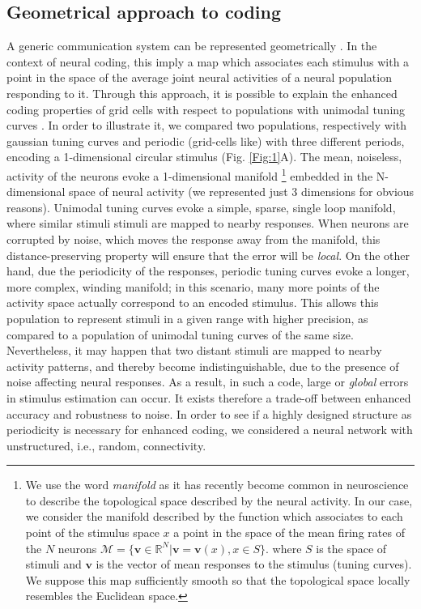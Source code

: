 \documentclass[a4paper]{article}
\begin{document}
\subsection{Geometrical approach to coding }
A generic communication system can be represented geometrically \cite[]{Shannon1949CommunicationNoise}. In the context of neural coding, this imply a map which associates each stimulus with a point in the space of the average joint neural activities of a neural population responding to it. Through this approach, it is possible to explain the enhanced coding properties of grid cells with respect to populations with unimodal tuning curves \cite[]{Sreenivasan2011GridComputation}. In order to illustrate it, we compared two populations, respectively with gaussian tuning curves and periodic (grid-cells like) with three different periods, encoding a 1-dimensional circular stimulus (Fig. \ref{Fig:1}A). The mean, noiseless, activity of the neurons evoke a 1-dimensional manifold 
\footnote{We use the word \textit{manifold} as it has recently become common in neuroscience to describe the topological space described by the neural activity. In our case, we consider the manifold described by the function which associates to each point of the stimulus space $x$ a point in the space of the mean firing rates of the $N$ neurons  $\mathcal{M} = \{ \mathbf{v}\in \mathbb{R}^N | \mathbf{v}= \mathbf{v}(x) , x \in S\}$. where $S$ is the space of stimuli and $\mathbf{v}$ is the vector of mean responses to the stimulus (tuning curves). We suppose this map sufficiently smooth so that the topological space locally resembles the Euclidean space. } embedded in the N-dimensional space of neural activity (we represented just 3 dimensions for obvious reasons). Unimodal tuning curves evoke a simple, sparse, single loop manifold, where similar stimuli stimuli are  mapped to nearby responses. When neurons are corrupted by noise, which moves the response away from the manifold, this distance-preserving property will ensure that the error will be \emph{local}. On the other hand, due the periodicity of the responses, periodic tuning curves evoke a longer, more complex, winding manifold; in this scenario, many more points of the activity space actually correspond to an encoded stimulus. This allows this population to represent stimuli in a given range with higher precision, as compared to a population of unimodal tuning curves of the same size.
Nevertheless, it may happen that two distant stimuli are mapped to nearby activity patterns, and thereby become indistinguishable, due to the presence of noise affecting neural responses. As a result, in such a code, large or \emph{global} errors in stimulus estimation can occur. It exists therefore a trade-off between enhanced accuracy and robustness to noise. In order to see if a highly designed structure as periodicity is necessary for enhanced coding, we considered a neural network with unstructured, i.e., random, connectivity.
\end{document}
